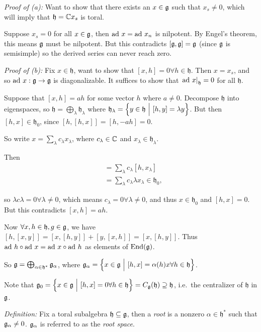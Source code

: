 \emph{Proof of (a):} Want to show that there exists an \(x\in {\mathfrak{g}}\)
such that \(x_s \neq 0\), which will imply that
\(\mathfrak{h} = {\mathbb{C}} x_s\) is toral.

Suppose \(x_s = 0\) for all \(x\in {\mathfrak{g}}\), then \(\mathrm{ad}~ x = \mathrm{ad}~ x_n\) is
nilpotent. By Engel's theorem, this means \({\mathfrak{g}}\) must be nilpotent.
But this contradicts \([{\mathfrak{g}}, {\mathfrak{g}}] = {\mathfrak{g}}\) (since \({\mathfrak{g}}\) is
semisimple) so the derived series can never reach zero.

\emph{Proof of (b):} Fix \(x\in \mathfrak{h}\), want to show that
\([x, h] = 0 \forall h\in \mathfrak{h}\). Then \(x = x_s\), and so
\(\mathrm{ad}~ x: {\mathfrak{g}} \to {\mathfrak{g}}\) is diagonalizable. It suffices to show that
\({\left.{\mathrm{ad}~ x}\right|_{\mathfrak h}} = 0\) for all \(\mathfrak h\).

Suppose that \([x, h] = ah\) for some vector \(h\) where \(a\neq 0\).
Decompose \(\mathfrak h\) into eigenspaces, so
\(\mathfrak h = \bigoplus_\lambda \mathfrak{h}_\lambda\) where
\(\mathfrak h_\lambda = \left\{{y \in \mathfrak h {~\mathrel{\Big|}~} [h, y] = \lambda y}\right\}\).
But then \([h, x] \in \mathfrak h_0\), since
\([h, [h, x]] = [h, -ah] = 0\).

So write \(x = \sum_\lambda c_\lambda x_\lambda\), where
\(c_\lambda \in {\mathbb{C}}\) and \(x_\lambda \in \mathfrak h_\lambda\).

Then \begin{align*}
[h, x] &= \sum_\lambda c_\lambda [h, x_\lambda] \\ 
&= \sum_\lambda c_\lambda \lambda x_\lambda \in \mathfrak h_0,
\end{align*}

so \(\lambda c\lambda = 0 \forall \lambda \neq 0\), which means
\(c_\lambda = 0 \forall \lambda \neq 0\), and thus
\(x\in \mathfrak h_0\) and \([h,x] = 0\). But this contradicts
\([x, h] = ah\).

Now \(\forall x, h\in\mathfrak h, g \in {\mathfrak{g}}\), we have
\([h, [x, y]] = [x, [h, y]] + [y, [x, h]] = [x, [h, y]]\). Thus
\(\mathrm{ad}~ h \circ \mathrm{ad}~ x = \mathrm{ad}~ x \circ \mathrm{ad}~ h\) as elements of
\(\mathrm{End}({\mathfrak{g}})\).

So \({\mathfrak{g}} = \bigoplus_{\alpha \in \mathfrak h^*} {\mathfrak{g}}_\alpha\), where
\({\mathfrak{g}}_\alpha = \left\{{x\in {\mathfrak{g}} {~\mathrel{\Big|}~} [h, x] = \alpha(h)x \forall h\in\mathfrak h}\right\}\).

Note that
\({\mathfrak{g}}_0 = \left\{{x \in {\mathfrak{g}} {~\mathrel{\Big|}~} [h, x] = 0 \forall h\in\mathfrak h}\right\} = C_{\mathfrak{g}}(\mathfrak h) \supseteq \mathfrak h\),
i.e.~the centralizer of \(\mathfrak h\) in \({\mathfrak{g}}\).

\emph{Definition:} Fix a toral subalgebra
\(\mathfrak h \subseteq {\mathfrak{g}}\), then a \emph{root} is a nonzero
\(\alpha \in \mathfrak h^*\) such that \({\mathfrak{g}}_\alpha \neq 0\).
\({\mathfrak{g}}_\alpha\) is referred to as the \emph{root space}.

